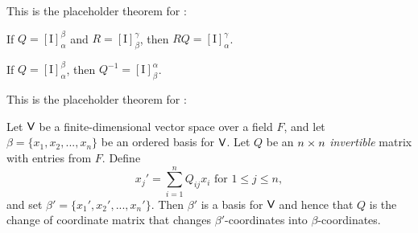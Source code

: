 \begin{additional theorem} \label{athm 2.49}
This is the placeholder theorem for :

 If \(Q = [\mathrm{I}]_{\alpha}^{\beta}\) and \(R = [\mathrm{I}]_{\beta}^{\gamma}\), then \(RQ = [\mathrm{I}]_{\alpha}^{\gamma}\).

 If \(Q = [\mathrm{I}]_{\alpha}^{\beta}\), then \(Q^{-1} = [\mathrm{I}]_{\beta}^{\alpha}\).
\end{additional theorem}

\begin{additional theorem} \label{athm 2.50}
This is the placeholder theorem for :

\sloppy Let \(\textsf{V}\) be a finite-dimensional vector space over a field \(F\), and let \(\beta = \{ x_1, x_2, ..., x_n \}\) be an ordered basis for \(\textsf{V}\).
Let \(Q\) be an \(n \times n\) \emph{invertible} matrix with entries from \(F\).
Define
\[
    x_j' = \sum_{i = 1}^n Q_{ij} x_i \text{ for } 1 \le j \le n,
\]
and set \(\beta' = \{ x_1', x_2', ..., x_n' \}\).
Then \(\beta'\) is a basis for \(\textsf{V}\) and hence that \(Q\) is the change of coordinate matrix that changes \(\beta'\)-coordinates into \(\beta\)-coordinates.
\end{additional theorem}
